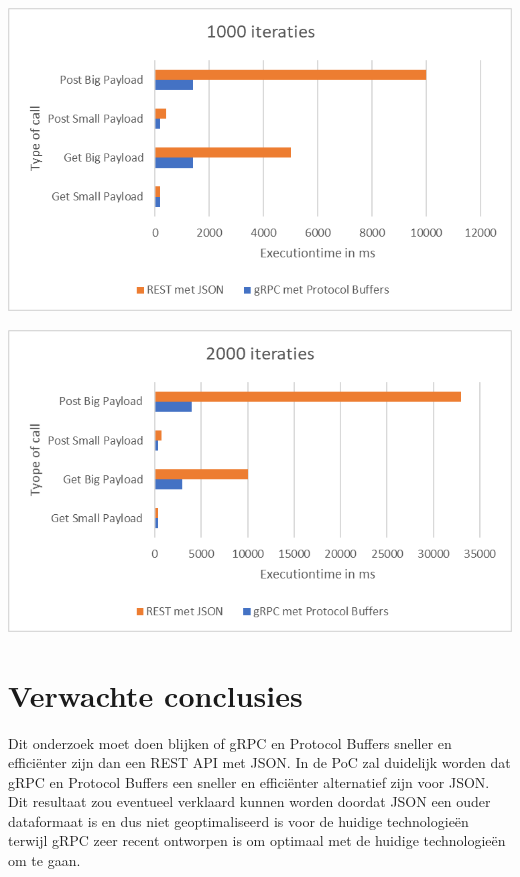 	\centering
	\includegraphics[width=1\linewidth]{screenshot001}



	\centering
	\includegraphics[width=1\linewidth]{screenshot002}

	



\section{Verwachte conclusies}
\label{sec:verwachte_conclusies}

Dit onderzoek moet doen blijken of gRPC en Protocol Buffers sneller en efficiënter zijn dan een REST API met JSON. In de PoC zal duidelijk worden dat gRPC en Protocol Buffers een sneller en efficiënter alternatief zijn voor JSON. Dit resultaat zou eventueel verklaard kunnen worden doordat JSON een ouder dataformaat is en dus niet geoptimaliseerd is voor de huidige technologieën terwijl gRPC zeer recent ontworpen is om optimaal met de huidige technologieën om te gaan.

